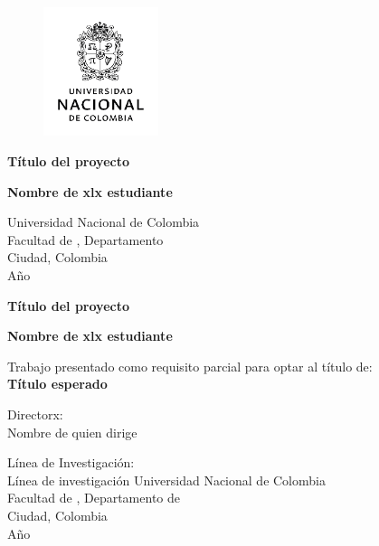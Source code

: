 
\begin{titlepage}
    \begin{center}
          
      	\begin{figure}[ht]
      		\includegraphics[width=0.3\textwidth]{images/EscudoUNAL.png}
      		\centering
      	\end{figure}
            
        \vspace{3.5cm}
            
        \LARGE{\textbf{Título del proyecto}}
        
        
        \vspace{3.5cm}
        \large{\textbf{Nombre de xlx estudiante}}
        \vfill
        
        
        \normalsize{Universidad Nacional de Colombia\\
					Facultad de , Departamento \\
					Ciudad, Colombia\\
					Año}
            
    \end{center}
\end{titlepage}
\let\cleardoublepage\clearpage
\begin{titlepage}
    \begin{center}            
        \LARGE{\textbf{Título del proyecto}}  
            
        \vspace{3.5cm}
        \large{\textbf{Nombre de xlx estudiante}}
            
        \vspace{3.5cm}
        \normalsize{Trabajo presentado como requisito parcial para optar al título de:\\
        \textbf{Título esperado}}    
     
        \vspace{2cm}
        \normalsize{Directorx:\\ Nombre de quien dirige}
        
        \vspace{1.2cm}
        \normalsize{L\'inea de Investigaci\'on:\\Línea de investigación}
        \vfill
		\normalsize{Universidad Nacional de Colombia\\
					Facultad de , Departamento de \\
					Ciudad, Colombia\\
					Año}
            
    \end{center}
\end{titlepage}
